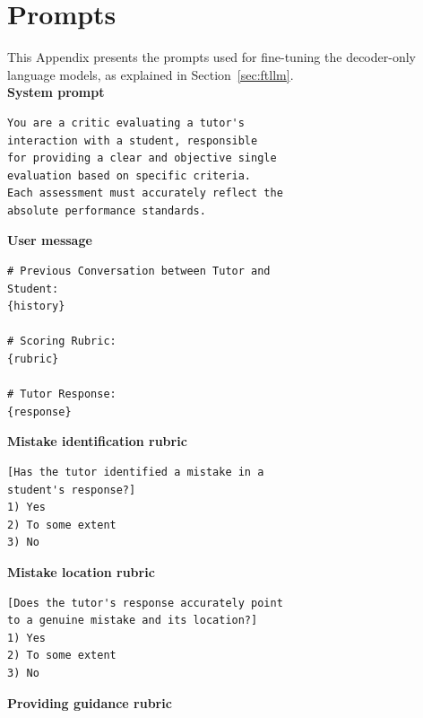 \documentclass[11pt]{article}
\begin{document}



% 

\appendix

\section{Prompts}
\label{sec:appendix_prompts}

This Appendix presents the prompts used for fine-tuning the decoder-only language models, as explained in Section~\ref{sec:ftllm}.\\
 
\noindent\textbf{System prompt}

\begin{verbatim}
You are a critic evaluating a tutor's 
interaction with a student, responsible
for providing a clear and objective single
evaluation based on specific criteria.
Each assessment must accurately reflect the 
absolute performance standards.
\end{verbatim}

\noindent\textbf{User message}

\begin{verbatim}
# Previous Conversation between Tutor and
Student:
{history}

# Scoring Rubric:
{rubric}

# Tutor Response:
{response}
\end{verbatim}

\noindent\textbf{Mistake identification rubric}

\begin{verbatim}
[Has the tutor identified a mistake in a 
student's response?]
1) Yes
2) To some extent
3) No
\end{verbatim}

\noindent\textbf{Mistake location rubric}

\begin{verbatim}
[Does the tutor's response accurately point
to a genuine mistake and its location?]
1) Yes
2) To some extent
3) No
\end{verbatim}

\noindent\textbf{Providing guidance rubric}
\end{document}
